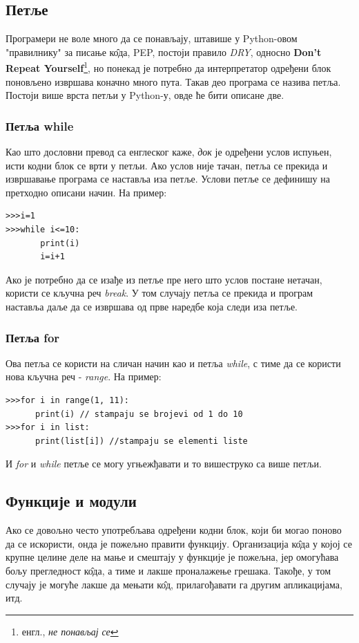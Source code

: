\documentclass[11pt, serbianc, english, titlepage]{article}
\begin{document}
		\subsection{Петље}
		Програмери не воле много да се понављају, штавише у Python-овом "правилнику" за писање к\^{о}да, PEP\cite{PEP}, постоји правило \emph{DRY}, односно \textbf{Don't Repeat Yourself}\footnote{енгл., \emph{не понављај се}}, но понекад је потребно да интерпретатор одређени блок поновљено извршава коначно много пута. Такав део програма се назива петља. Постоји више врста петљи у Python-у, овде ће бити описане две. 
		\subsubsection{Петља while}
		Као што дословни превод са енглеског каже, \emph{док} је одређени услов испуњен, исти кодни блок се врти у петљи. Ако услов није тачан, петља се прекида и извршавање програма се наставља иза петље. Услови петље се дефинишу на претходно описани начин. На пример:
		\begin{lstlisting}[caption = Пример while петље, label = while]
>>>i=1
>>>while i<=10:
       print(i)
       i=i+1
		\end{lstlisting}
		Ако је потребно да се изађе из петље пре него што услов постане нетачан, користи се кључна реч \emph{break}. У том случају петља се прекида и програм наставља даље да се извршава од прве наредбе која следи иза петље. 
		\pagebreak
		\subsubsection{Петља for}
		Ова петља се користи на сличан начин као и петља \emph{while}, с тиме да се користи нова кључна реч - \emph{range}. На пример:
		\begin{lstlisting}[caption = Примери \emph{for} петље, label = for]
>>>for i in range(1, 11):
      print(i) // stampaju se brojevi od 1 do 10
>>>for i in list:
      print(list[i]) //stampaju se elementi liste
		\end{lstlisting}
		И \emph{for} и \emph{while} петље се могу угњежђавати и то вишеструко са више петљи. 
		\subsection{Функције и модули}
		Ако се довољно често употребљава одређени кодни блок, који би могао поново да се искористи, онда је пожељно правити функцију. Организација к\^{о}да у којој се крупне целине деле на мање и смештају у функције је пожељна, јер омогућава бољу прегледност к\^{о}да, а тиме и лакше проналажење грешака. Такође, у том случају је могуће лакше да мењати к\^{о}д, прилагођавати га другим апликацијама, итд.
\end{document}
